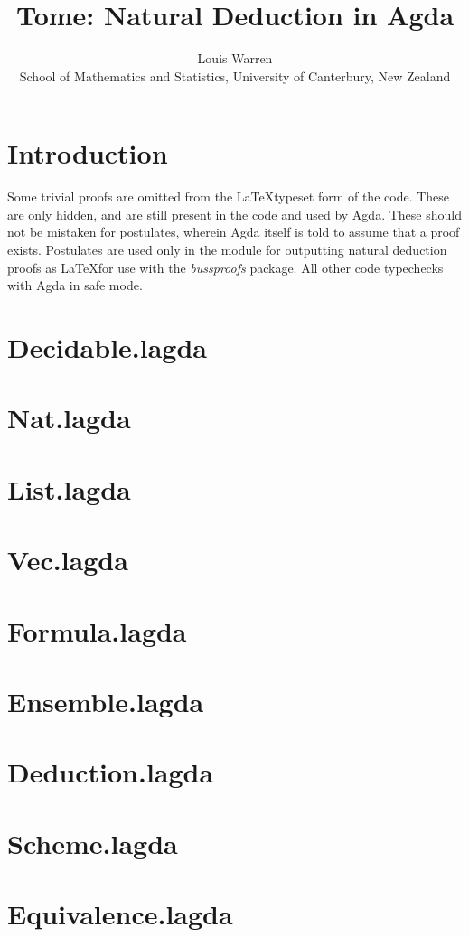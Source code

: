 \documentclass{article}
\begin{document}
\title{Tome: Natural Deduction in Agda}
\author{
Louis Warren \\
School of Mathematics and Statistics, University of Canterbury, New Zealand
}
\date{}
\maketitle

\tableofcontents

\section{Introduction}
Some trivial proofs are omitted from the \LaTeX typeset form of the code. These
are only hidden, and are still present in the code and used by Agda. These
should not be mistaken for postulates, wherein Agda itself is told to assume
that a proof exists. Postulates are used only in the module for outputting
natural deduction proofs as \LaTeX for use with the \emph{bussproofs} package.
All other code typechecks with Agda in safe mode.

\section{Decidable.lagda}


\section{Nat.lagda}


\section{List.lagda}


\section{Vec.lagda}


\section{Formula.lagda}


\section{Ensemble.lagda}


\section{Deduction.lagda}


\section{Scheme.lagda}


\section{Equivalence.lagda}


{}

\end{document}
